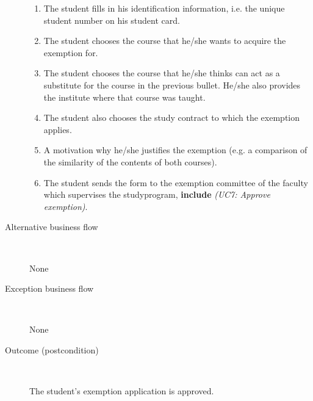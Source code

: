 \begin{description}
\begin{enumerate}
	  	\item The student fills in his identification information, i.e. the unique
	  	student number on his student card.
	  	\item The student chooses the course that he/she wants to acquire the
	  	exemption for. 
	  	\item The student chooses the course that he/she thinks can act as a
	  	substitute for the course in the previous bullet. He/she also provides the
	  	institute where that course was taught.
	  	\item The student also chooses the study contract to which the exemption
	  	applies.
	  	\item A motivation why he/she justifies the exemption (e.g. a comparison of
	  	the similarity of the contents of both courses).
	  	\item The student sends the form to the exemption committee of the faculty
	  	which supervises the studyprogram, \textbf{include} \emph{(UC7: Approve
	  	exemption)}.
	\end{enumerate}
	\item[Alternative business flow] \ 
		\par None
	\item[Exception business flow] \
		\par None
	\item[Outcome (postcondition)] \ 
		\par The student's exemption application is approved.
\end{description}